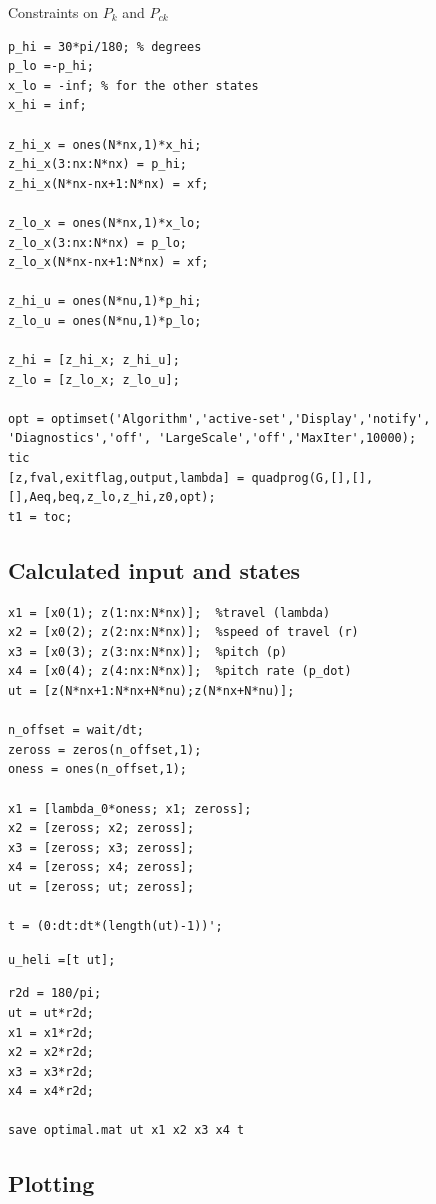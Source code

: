 \documentclass[11pt,a4paper,USenglish]{article} %
\begin{document}
\begin{par}
Constraints on $P_{k}$ and $P_{ck}$ 
\end{par} \vspace{1em}
\begin{verbatim}
p_hi = 30*pi/180; % degrees
p_lo =-p_hi;
x_lo = -inf; % for the other states
x_hi = inf;

z_hi_x = ones(N*nx,1)*x_hi;
z_hi_x(3:nx:N*nx) = p_hi;
z_hi_x(N*nx-nx+1:N*nx) = xf;

z_lo_x = ones(N*nx,1)*x_lo;
z_lo_x(3:nx:N*nx) = p_lo;
z_lo_x(N*nx-nx+1:N*nx) = xf;

z_hi_u = ones(N*nu,1)*p_hi;
z_lo_u = ones(N*nu,1)*p_lo;

z_hi = [z_hi_x; z_hi_u];
z_lo = [z_lo_x; z_lo_u];

opt = optimset('Algorithm','active-set','Display','notify', 'Diagnostics','off', 'LargeScale','off','MaxIter',10000);
tic
[z,fval,exitflag,output,lambda] = quadprog(G,[],[],[],Aeq,beq,z_lo,z_hi,z0,opt);
t1 = toc;
\end{verbatim}

\subsection*{Calculated input and states}

\begin{verbatim}
x1 = [x0(1); z(1:nx:N*nx)];  %travel (lambda)
x2 = [x0(2); z(2:nx:N*nx)];  %speed of travel (r)
x3 = [x0(3); z(3:nx:N*nx)];  %pitch (p)
x4 = [x0(4); z(4:nx:N*nx)];  %pitch rate (p_dot)
ut = [z(N*nx+1:N*nx+N*nu);z(N*nx+N*nu)];

n_offset = wait/dt;
zeross = zeros(n_offset,1);
oness = ones(n_offset,1);

x1 = [lambda_0*oness; x1; zeross];
x2 = [zeross; x2; zeross];
x3 = [zeross; x3; zeross];
x4 = [zeross; x4; zeross];
ut = [zeross; ut; zeross];

t = (0:dt:dt*(length(ut)-1))';
\end{verbatim}

\begin{verbatim}
u_heli =[t ut];
\end{verbatim}

\begin{verbatim}
r2d = 180/pi;
ut = ut*r2d;
x1 = x1*r2d;
x2 = x2*r2d;
x3 = x3*r2d;
x4 = x4*r2d;

save optimal.mat ut x1 x2 x3 x4 t
\end{verbatim}


\subsection*{Plotting}
\end{document}
